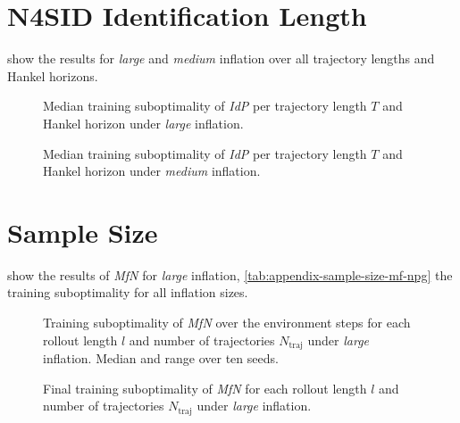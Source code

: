 \section{N4SID Identification Length}
\label{sec:app-identification}

 show the results for
\emph{large} and \emph{medium} inflation over all trajectory lengths and Hankel horizons.

\begin{figure}[htbp]
  \centering
  \caption{Median training suboptimality of \emph{IdP} per trajectory length $T$ and
    Hankel horizon under \emph{large} inflation.}
  \label{fig:app-identification-large}
\end{figure}

\begin{figure}[htbp]
  \centering
  \caption{Median training suboptimality of \emph{IdP} per trajectory length $T$ and
    Hankel horizon under \emph{medium} inflation.}
  \label{fig:app-identification-medium}
\end{figure}

\section{Sample Size}
\label{sec:app-sample-size}

 show the
results of \emph{MfN} for \emph{large} inflation, \cref{tab:appendix-sample-size-mf-npg} the
training suboptimality for all inflation sizes.

\begin{figure}[htbp]
  \centering
  \caption{Training suboptimality of \emph{MfN} over the environment steps for each rollout
    length $l$ and number of trajectories $N_{\mathrm{traj}}$ under \emph{large} inflation. Median and range over ten
    seeds.}
  \label{fig:app-sample-size-mf-npg-large-curves}
\end{figure}

\begin{figure}[htbp]
  \centering
  \caption{Final training suboptimality of \emph{MfN} for each rollout length $l$ and number of
    trajectories $N_{\mathrm{traj}}$ under \emph{large} inflation.}
  \label{fig:app-sample-size-mf-npg-large-subopt}
\end{figure}

